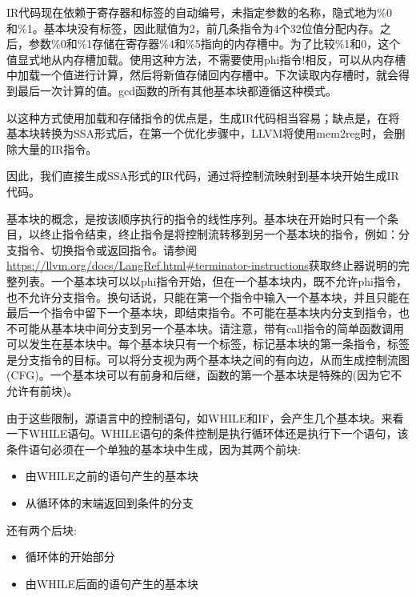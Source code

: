 IR代码现在依赖于寄存器和标签的自动编号，未指定参数的名称，隐式地为\%0和\%1。基本块没有标签，因此赋值为2，前几条指令为4个32位值分配内存。之后，参数\%0和\%1存储在寄存器\%4和\%5指向的内存槽中。为了比较\%1和0，这个值显式地从内存槽加载。使用这种方法，不需要使用phi指令!相反，可以从内存槽中加载一个值进行计算，然后将新值存储回内存槽中。下次读取内存槽时，就会得到最后一次计算的值。gcd函数的所有其他基本块都遵循这种模式。

以这种方式使用加载和存储指令的优点是，生成IR代码相当容易；缺点是，在将基本块转换为SSA形式后，在第一个优化步骤中，LLVM将使用mem2reg时，会删除大量的IR指令。

因此，我们直接生成SSA形式的IR代码，通过将控制流映射到基本块开始生成IR代码。


基本块的概念，是按该顺序执行的指令的线性序列。基本块在开始时只有一个条目，以终止指令结束，终止指令是将控制流转移到另一个基本块的指令，例如：分支指令、切换指令或返回指令。请参阅\url{https://llvm.org/docs/LangRef.html#terminator-instructions}获取终止器说明的完整列表。一个基本块可以以phi指令开始，但在一个基本块内，既不允许phi指令，也不允许分支指令。换句话说，只能在第一个指令中输入一个基本块，并且只能在最后一个指令中留下一个基本块，即结束指令。不可能在基本块内分支到指令，也不可能从基本块中间分支到另一个基本块。请注意，带有call指令的简单函数调用可以发生在基本块中。每个基本块只有一个标签，标记基本块的第一条指令，标签是分支指令的目标。可以将分支视为两个基本块之间的有向边，从而生成控制流图(CFG)。一个基本块可以有前身和后继，函数的第一个基本块是特殊的(因为它不允许有前块)。

由于这些限制，源语言中的控制语句，如WHILE和IF，会产生几个基本块。来看一下WHILE语句。WHILE语句的条件控制是执行循环体还是执行下一个语句，该条件语句必须在一个单独的基本块中生成，因为其两个前块:

\begin{itemize}
\item
由WHILE之前的语句产生的基本块

\item
从循环体的末端返回到条件的分支
\end{itemize}

还有两个后块:

\begin{itemize}
\item
循环体的开始部分

\item
由WHILE后面的语句产生的基本块
\end{itemize}

